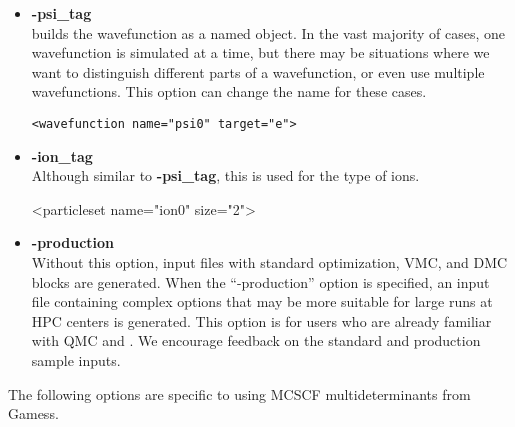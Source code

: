 \begin{itemize}
\item \textbf{-psi\_tag}\\
\qmcpack builds the wavefunction as a named object. In the vast majority of cases, one wavefunction is simulated at a time, but there may be situations where we want to distinguish different parts of a wavefunction, or even use multiple wavefunctions. This option can change the name for these cases. 

\begin{lstlisting}[style=QMCPXML]
   <wavefunction name="psi0" target="e">
\end{lstlisting}

\item \textbf{-ion\_tag} \\
Although similar to \textbf{-psi\_tag}, this is used for the type of ions. \\
\begin{shade}
  <particleset name="ion0" size="2">
\end{shade}


\item \textbf{-production}\\

Without this option, input files with standard optimization, VMC, and
DMC blocks are generated. When the ``-production'' option is
specified, an input file containing complex options that may be
more suitable for large runs at HPC centers is generated. This option
is for users who are already familiar with QMC and \qmcpack. We encourage feedback
on the standard and production sample inputs.


\end{itemize}

The following options are specific to using MCSCF multideterminants from Gamess. 

